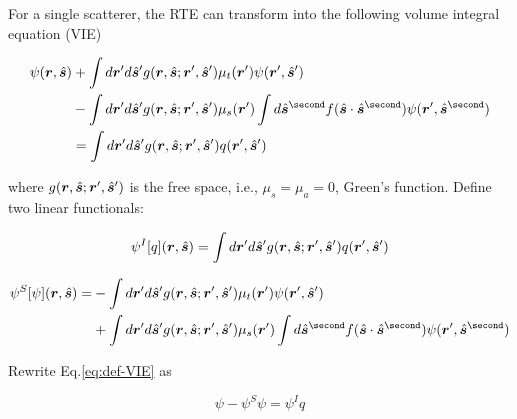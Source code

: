 \documentclass [10pt,letterpaper]{article}
\renewcommand{\vec}{\vectorsym}
\newcommand{\unitvec}[1]{\hat{\vec{#1}}}
\begin{document}
For a single scatterer, the RTE can transform into the following volume integral equation (VIE)

\begin{equation}\label{eq:def-VIE}\begin{split}
\psi(\vec{r},\unitvec{s})
&+
\int d\vec{r}^\prime d\unitvec{s}^\prime g(\vec{r},\unitvec{s};\vec{r}^\prime,\unitvec{s}^\prime)
\mu_t(\vec{r}^\prime)\psi(\vec{r}^\prime,\unitvec{s}^\prime)
\\ &-
\int d\vec{r}^\prime d\unitvec{s}^\prime g(\vec{r},\unitvec{s};\vec{r}^\prime,\unitvec{s}^\prime)
\mu_s(\vec{r}^\prime)\int d\unitvec{s}^{\second}
f(\unitvec{s}\cdot\unitvec{s}^{\second})\psi(\vec{r}^\prime,\unitvec{s}^{\second})
\\ &=
\int d\vec{r}^\prime d\unitvec{s}^\prime g(\vec{r},\unitvec{s};\vec{r}^\prime,\unitvec{s}^\prime)
q(\vec{r}^\prime,\unitvec{s}^\prime)
\end{split}\end{equation}

where $g(\vec{r},\unitvec{s};\vec{r}^\prime,\unitvec{s}^\prime)$ is the free space, i.e., $\mu_s=\mu_a=0$, Green's function.
Define two linear functionals:

\begin{equation} \label{eq:def-psiI-general}
    \psi^I[q](\vec{r},\unitvec{s})=
    \int d\vec{r}^\prime d\unitvec{s}^\prime
    g(\vec{r},\unitvec{s};\vec{r}^\prime,\unitvec{s}^\prime)
    q(\vec{r}^\prime,\unitvec{s}^\prime)
\end{equation}

\begin{equation} \label{eq:def-psiS-general}
	\begin{split}
	    \psi^S[\psi](\vec{r},\unitvec{s})=
	    &-\int d\vec{r}^\prime d\unitvec{s}^\prime 
	    g(\vec{r},\unitvec{s};\vec{r}^\prime,\unitvec{s}^\prime)
	    \mu_t(\vec{r}^\prime)
	    \psi(\vec{r}^\prime,\unitvec{s}^\prime) \\
	    &+\int d\vec{r}^\prime d\unitvec{s}^\prime 
	    g(\vec{r},\unitvec{s};\vec{r}^\prime,\unitvec{s}^\prime)
	    \mu_s(\vec{r}^\prime)\int d\unitvec{s}^{\second}
	    f(\unitvec{s}\cdot\unitvec{s}^{\second})
	    \psi(\vec{r}^\prime,\unitvec{s}^{\second})
	\end{split}
\end{equation}


Rewrite Eq.\eqref{eq:def-VIE} as

\begin{equation}\label{eq:short-VIE}
	\psi-\psi^S\psi=\psi^I q
\end{equation}
\end{document}
